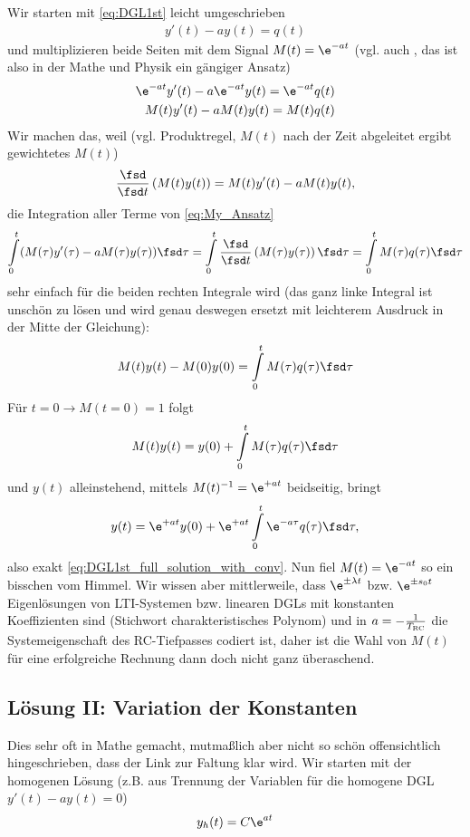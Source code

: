 Wir starten mit \eqref{eq:DGL1st} leicht umgeschrieben
\begin{align}
y'(t) - a y(t) = q(t)
\end{align}
und multiplizieren beide Seiten mit dem Signal $M(t) = \e^{-a t}$ (vgl. auch \cite[S. 547]{Arfken2005}, das ist also in der Mathe und Physik ein gängiger Ansatz)
\begin{align}
\e^{-a t} y'(t) - a \e^{-a t} y(t) = \e^{-a t} q(t)\\
M(t) y'(t) - a M(t) y(t) = M(t) q(t)
\label{eq:My_Ansatz}
\end{align}
Wir machen das, weil (vgl. Produktregel, $M(t)$ nach der Zeit abgeleitet ergibt gewichtetes $M(t)$)
\begin{align}
\frac{\fsd}{\fsd t}\left(M(t) y(t)\right) = M(t) y'(t) - a M(t) y(t),
\end{align}
die Integration aller Terme von \eqref{eq:My_Ansatz}
\begin{align}
\int\limits_{0}^{t} (M(\tau) y'(\tau) - a M(\tau) y(\tau)) \fsd \tau =
\int\limits_{0}^{t} \frac{\fsd}{\fsd t}\left(M(\tau) y(\tau)\right) \fsd \tau = \int\limits_{0}^{t} M(\tau) q(\tau) \fsd\tau
\end{align}
sehr einfach für die beiden rechten Integrale wird (das ganz linke Integral ist unschön zu lösen und wird genau deswegen ersetzt mit leichterem Ausdruck in der Mitte der Gleichung):
\begin{align}
M(t) y(t) - M(0)y(0) = \int\limits_{0}^{t} M(\tau) q(\tau) \fsd\tau
\end{align}
Für $t=0 \rightarrow M(t=0)=1$ folgt
\begin{align}
M(t) y(t) = y(0) + \int\limits_{0}^{t} M(\tau) q(\tau) \fsd\tau
\end{align}
und $y(t)$ alleinstehend, mittels $M(t)^{-1} = \e^{+a t}$ beidseitig, bringt
\begin{align}
y(t) = \e^{+a t} y(0) + \e^{+a t} \int\limits_{0}^{t} \e^{-a \tau} q(\tau) \fsd\tau,
\end{align}
also exakt \eqref{eq:DGL1st_full_solution_with_conv}. Nun fiel $M(t) = \e^{-a t}$ so ein bisschen vom Himmel. Wir wissen aber mittlerweile, dass $\e^{\pm \lambda t}$
bzw. $\e^{\pm s_0 t}$ Eigenlösungen von LTI-Systemen bzw. linearen DGLs mit konstanten Koeffizienten sind (Stichwort charakteristisches Polynom) und in $a=-\frac{1}{T_\text{RC}}$ die Systemeigenschaft des RC-Tiefpasses codiert ist, daher ist die Wahl von $M(t)$ für eine erfolgreiche Rechnung dann doch nicht ganz überaschend.

\subsection*{Lösung II: Variation der Konstanten}
Dies sehr oft in Mathe gemacht, mutmaßlich aber nicht so schön offensichtlich hingeschrieben, dass der Link zur Faltung klar wird.
%
Wir starten mit der homogenen Lösung (z.B. aus Trennung der Variablen für die homogene DGL $y'(t) - a y(t) = 0$)
\begin{align}
y_h(t) = C \e^{a t}
\end{align}

